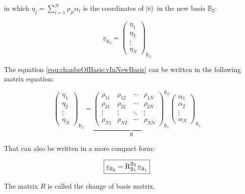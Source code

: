 in which $\eta_j = \sum_{i=1}^{N}\rho_{ji} \alpha_i $ is the coordinates of $ \ket{v} $ in the new basis $\mathbb{B}_2$:

\begin{equation*}
	\underline{v}_{\mathbb{B}_2} = \begin{pmatrix}
		\eta_1 \\
		\eta_2 \\
		\vdots \\
		\eta_N
	\end{pmatrix}_{\mathbb{B}_2}
\end{equation*}


The equation \ref{equ:chanbeOfBasis:vInNewBasis} can be written in the following matrix equation:

\begin{equation}
	\begin{pmatrix}
		\eta_1 \\
		\eta_2 \\
		\vdots \\
		\eta_N
	\end{pmatrix}_{\mathbb{B}_2} = 
	\underbrace{\begin{pmatrix}
			\rho_{11} & \rho_{12} & \cdots & \rho_{1N}\\
			\rho_{21} & \rho_{22} & \cdots & \rho_{2N}\\
			\vdots    & \vdots    & \ddots & \vdots\\
			\rho_{N1} & \rho_{N2} & \cdots & \rho_{NN} 
		\end{pmatrix}_{\mathbb{B}_1}^{\mathbb{B}_2}}_{R}
	\begin{pmatrix}
		\alpha_1 \\
		\alpha_2 \\
		\vdots \\
		\alpha_N
	\end{pmatrix}_{\mathbb{B}_1} 
\end{equation}

That can also be written in a more compact form:

\begin{LARGE}
	\begin{equation}
		\boxed{
			\underline{v}_{\mathbb{B}_2} = \operatorname{R}_{\mathbb{B}_1}^{\mathbb{B}_2} \underline{v}_{\mathbb{B}_1}
		}
	\end{equation}
	\label{equ:changeOfBasis_compact}
\end{LARGE}


The matrix $R$ is called the change of basis matrix. \newline

